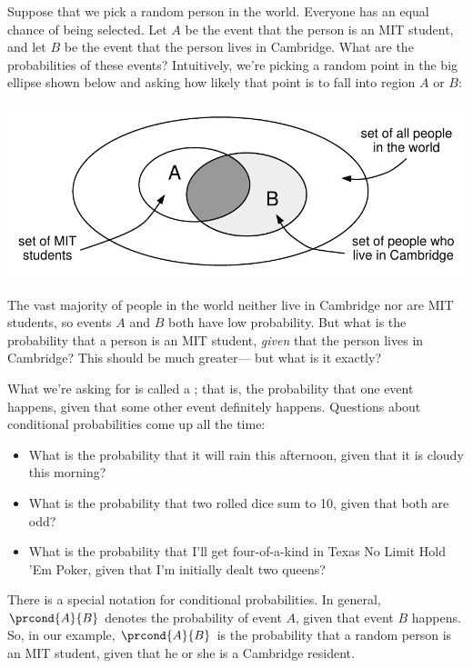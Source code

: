 Suppose that we pick a random person in the world.  Everyone has an
equal chance of being selected.  Let $A$ be the event that the person
is an MIT student, and let $B$ be the event that the person lives in
Cambridge.  What are the probabilities of these events?  Intuitively,
we're picking a random point in the big ellipse shown below and asking
how likely that point is to fall into region $A$ or $B$:
%
\begin{center}
\includegraphics[height=2in]{figures/cambridge-conditional}
\end{center}
%
The vast majority of people in the world neither live in Cambridge nor
are MIT students, so events $A$ and $B$ both have low probability.
But what is the probability that a person is an MIT student,
\textit{given} that the person lives in Cambridge?  This should be
much greater--- but what is it exactly?

What we're asking for is called a ; that
is, the probability that one event happens, given that some other
event definitely happens.  Questions about conditional probabilities
come up all the time:
%
\begin{itemize}
\item What is the probability that it will rain this afternoon, given
that it is cloudy this morning?
\item What is the probability that two rolled dice sum to 10, given
that both are odd?
\item What is the probability that I'll get four-of-a-kind in Texas No
Limit Hold 'Em Poker, given that I'm initially dealt two queens?
\end{itemize}

There is a special notation for conditional probabilities.  In
general, $\prcond{A}{B}$ denotes the probability of event $A$, given
that event $B$ happens.  So, in our example, $\prcond{A}{B}$ is the
probability that a random person is an MIT student, given that he or
she is a Cambridge resident.

